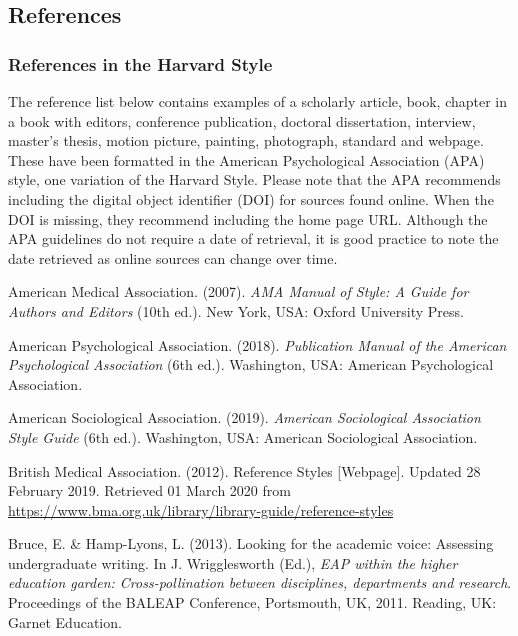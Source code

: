 \documentclass[english, 12pt, a4paper, biz, utf8, a-2b, online]{aaltothesis}
\begin{document}
\subsection*{References}
\subsubsection*{References in the Harvard Style}

The reference list below contains examples of a scholarly article, book, chapter
in a book with editors, conference publication, doctoral dissertation, 
interview, master’s thesis, motion picture, painting, photograph, standard and 
webpage. These have been formatted in the American Psychological Association 
(APA) style, one variation of the Harvard Style. Please note that the APA 
recommends including the digital object identifier (DOI) for sources found 
online. When the DOI is missing, they recommend including the home page URL. 
Although the APA guidelines do not require a date of retrieval, it is good 
practice to note the date retrieved as online sources can change over time.

\vspace{1ex}
\noindent
American Medical Association. (2007). 
\textit{AMA Manual of Style: A Guide for Authors and Editors} 
(10th ed.). New York, USA: Oxford University Press.

\vspace{1ex}
\noindent
American Psychological Association. (2018). 
\textit{Publication Manual of the American Psychological Association} 
(6th ed.). Washington, USA: American Psychological Association.

\vspace{1ex}
\noindent
American Sociological Association. (2019). 
\textit{American Sociological Association Style Guide} 
(6th ed.). Washington, USA: American Sociological Association.

\vspace{1ex}
\noindent
British Medical Association. (2012). 
Reference Styles [Webpage]. Updated 28 February 2019. 
Retrieved 01 March 2020 from 
\url{https://www.bma.org.uk/library/library-guide/reference-styles}

\vspace{1ex}
\noindent
Bruce, E. \& Hamp-Lyons, L. (2013). 
Looking for the academic voice: Assessing undergraduate writing. 
In J. Wrigglesworth (Ed.), 
\textit{EAP within the higher education garden: Cross-pollination between 
	disciplines, departments and research}. 
Proceedings of the BALEAP Conference, Portsmouth, UK, 2011. Reading, UK: Garnet
Education.
\end{document}

